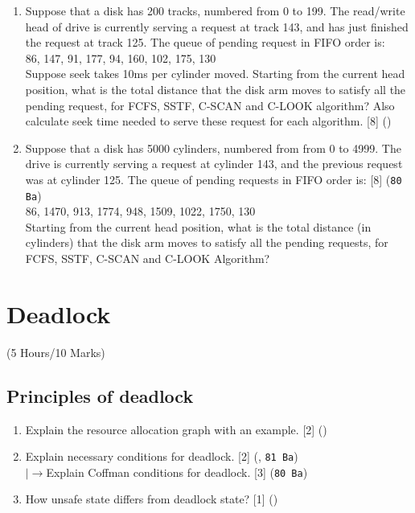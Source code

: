 \documentclass[12pt]{article}
\newcommand{\lb}{\\$\left|\rightarrow\right.$}
\begin{document}
\begin{enumerate}
			\item Suppose that a disk has 200 tracks, numbered from 0 to 199. The read/write head of drive is currently serving a request at track 143, and has just finished the request at track 125. The queue of pending request in FIFO order is:\\
			86, 147, 91, 177, 94, 160, 102, 175, 130\\
			Suppose seek takes 10ms per cylinder moved. Starting from the current head position, what is the total distance that the disk arm moves to satisfy all the pending request, for FCFS, SSTF, C-SCAN and C-LOOK algorithm? Also calculate seek time needed to serve these request for each algorithm. \hfill [8] ()

			\item Suppose that a disk has 5000 cylinders, numbered from from 0 to 4999. The drive is currently serving a request at cylinder 143, and the previous request was at cylinder 125. The queue of pending requests in FIFO order is: \hfill [8] (\texttt{80 Ba})\\
			86, 1470, 913, 1774, 948, 1509, 1022, 1750, 130\\
			Starting from the current head position, what is the total distance (in cylinders) that the disk arm moves to satisfy all the pending requests, for FCFS, SSTF, C-SCAN and C-LOOK Algorithm?
		\end{enumerate}

\pagebreak
\section{Deadlock}
	\begin{center}(5 Hours/10 Marks)\end{center}
	\subsection{Principles of deadlock}
		\begin{enumerate}
			\item Explain the resource allocation graph with an example. \hfill [2] ()

			\item Explain necessary conditions for deadlock. \hfill [2] (, \texttt{81 Ba})
			\lb Explain Coffman conditions for deadlock. \hfill [3] (\texttt{80 Ba})

			\item How unsafe state differs from deadlock state? \hfill [1] ()
		\end{enumerate}
\end{document}
